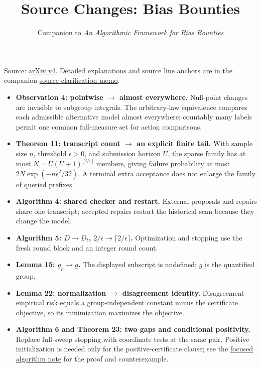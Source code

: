 \documentclass[11pt]{article}
\title{Source Changes: Bias Bounties}
\author{Companion to \emph{An Algorithmic Framework for Bias Bounties}}
\date{}
\begin{document}
\maketitle
Source: \href{https://arxiv.org/abs/2201.10408v4}{arXiv v4}. Detailed explanations and source line anchors are in the companion \href{SOURCE_CLARIFICATIONS.md}{source clarification memo}.
\begin{itemize}
\item \textbf{Observation 4: pointwise $\to$ almost everywhere.} Null-point changes are invisible to subgroup integrals. The arbitrary-law equivalence compares each admissible alternative model almost everywhere; countably many labels permit one common full-measure set for action comparisons.
\item \textbf{Theorem 11: transcript count $\to$ an explicit finite tail.} With sample size $n$, threshold $\epsilon>0$, and submission horizon $U$, the sparse family has at most $N=U(U+1)^{\lfloor2/\epsilon\rfloor}$ members, giving failure probability at most $2N\exp(-n\epsilon^2/32)$. A terminal extra acceptance does not enlarge the family of queried prefixes.
\item \textbf{Algorithm 4: shared checker and restart.} External proposals and repairs share one transcript; accepted repairs restart the historical scan because they change the model.
\item \textbf{Algorithm 5: $D\to D_t$, $2/\epsilon\to\lceil2/\epsilon\rceil$.} Optimization and stopping use the fresh round block and an integer round count.
\item \textbf{Lemma 15: $g_p\to g$.} The displayed subscript is undefined; $g$ is the quantified group.
\item \textbf{Lemma 22: normalization $\to$ disagreement identity.} Disagreement empirical risk equals a group-independent constant minus the certificate objective, so its minimization maximizes the objective.
\item \textbf{Algorithm 6 and Theorem 23: two gaps and conditional positivity.} Replace full-sweep stopping with coordinate tests at the same pair. Positive initialization is needed only for the positive-certificate clause; see the \href{ALGORITHM6_THEOREM23_CLARIFICATION.pdf}{focused algorithm note} for the proof and counterexample.
\end{itemize}
\end{document}

